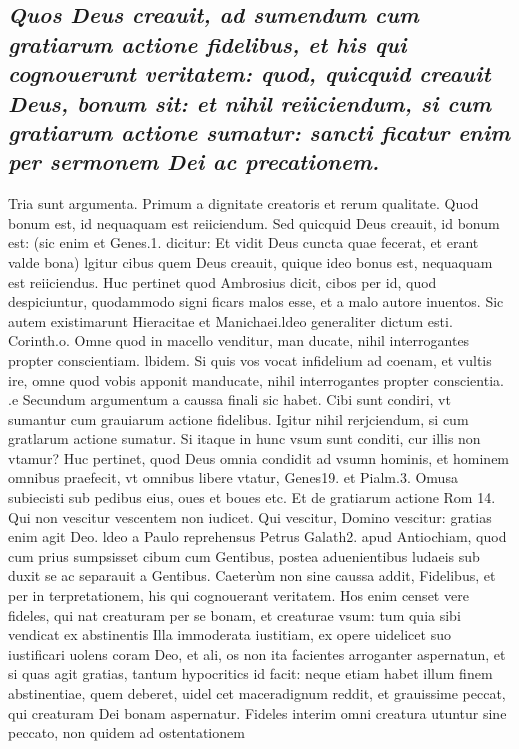 \documentclass{article}
\begin{document}
\begin{pages}
\subsection*{\textit{Quos Deus creauit, ad sumendum cum gratiarum actione fidelibus, et his qui cognouerunt veritatem: quod, quicquid creauit Deus, bonum sit: et nihil reiiciendum, si cum gratiarum actione sumatur: sancti ficatur enim per sermonem Dei ac precationem. }}\pstart Tria sunt argumenta. Primum a dignitate creatoris et rerum qualitate. Quod bonum est, id nequaquam est reiiciendum. Sed quicquid Deus creauit, id bonum est: (sic enim et Genes.1. dicitur: Et vidit Deus cuncta quae fecerat, et erant valde bona) lgitur cibus quem Deus creauit, quique ideo bonus est, nequaquam est reiiciendus. Huc pertinet quod Ambrosius dicit, cibos per id, quod despiciuntur, quodammodo signi ficars malos esse, et a malo autore inuentos. Sic autem existimarunt Hieracitae et Manichaei.ldeo generaliter dictum esti. Corinth.o. Omne quod in macello venditur, man  ducate, nihil interrogantes propter conscientiam. lbidem. Si quis vos vocat infidelium ad coenam,  et vultis ire, omne quod vobis apponit manducate, nihil interrogantes propter conscientia. .e  \pend\pstart Secundum argumentum a caussa finali sic habet. Cibi sunt condiri, vt sumantur cum grauiarum actione fidelibus. Igitur nihil rerjciendum, si cum gratlarum actione sumatur. Si itaque in hunc vsum sunt conditi, cur illis non vtamur? Huc pertinet, quod Deus omnia condidit ad vsumn hominis, et hominem omnibus praefecit, vt omnibus libere vtatur, Genes19. et Pialm.3. Omusa subiecisti sub pedibus eius, oues et boues etc. Et de gratiarum actione Rom 14. Qui non vescitur vescentem non iudicet. Qui vescitur, Domino vescitur: gratias enim agit Deo. ldeo a Paulo reprehensus Petrus Galath2. apud Antiochiam, quod cum prius sumpsisset cibum cum Gentibus, postea aduenientibus ludaeis sub duxit se ac separauit a Gentibus. Caeterùm non sine caussa addit, Fidelibus, et per in terpretationem, his qui cognouerant veritatem. Hos enim censet vere fideles, qui nat creaturam per se bonam, et creaturae vsum: tum quia sibi vendicat ex abstinentis Illa immoderata iustitiam, ex opere uidelicet suo iustificari uolens coram Deo, et ali, os non ita facientes arroganter aspernatun, et si quas agit gratias, tantum hypocritics id facit: neque etiam habet illum finem abstinentiae, quem deberet, uidel cet maceradignum reddit, et grauissime peccat, qui creaturam Dei bonam aspernatur. Fideles interim omni creatura utuntur sine peccato, non quidem ad ostentationem  \pend
\vspace{0.5cm}\noindent

\end{pages}
\end{document}
